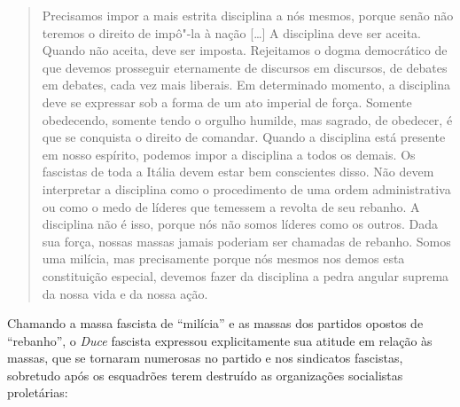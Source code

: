 \begin{quote}
Precisamos impor a mais estrita disciplina a nós mesmos, porque senão
não teremos o direito de impô"-la à nação {[}\ldots{}{]} A disciplina deve ser
aceita. Quando não aceita, deve ser imposta. Rejeitamos o dogma
democrático de que devemos prosseguir eternamente de discursos em
discursos, de debates em debates, cada vez mais liberais. Em determinado
momento, a disciplina deve se expressar sob a forma de um ato imperial
de força. Somente obedecendo, somente tendo o orgulho humilde, mas
sagrado, de obedecer, é que se conquista o direito de comandar. Quando a
disciplina está presente em nosso espírito, podemos impor a disciplina a
todos os demais. Os fascistas de toda a Itália devem estar bem
conscientes disso. Não devem interpretar a disciplina como o
procedimento de uma ordem administrativa ou como o medo de líderes que
temessem a revolta de seu rebanho. A disciplina não é isso, porque nós
não somos líderes como os outros. Dada sua força, nossas massas jamais
poderiam ser chamadas de rebanho. Somos uma milícia, mas precisamente
porque nós mesmos nos demos esta constituição especial, devemos fazer da
disciplina a pedra angular suprema da nossa vida e da nossa ação.
\end{quote}

Chamando a massa fascista de ``milícia'' e as massas dos partidos opostos
de ``rebanho'', o \emph{Duce} fascista expressou explicitamente sua
atitude em relação às massas, que se tornaram numerosas no partido e nos
sindicatos fascistas, sobretudo após os esquadrões terem destruído as
organizações socialistas proletárias:

